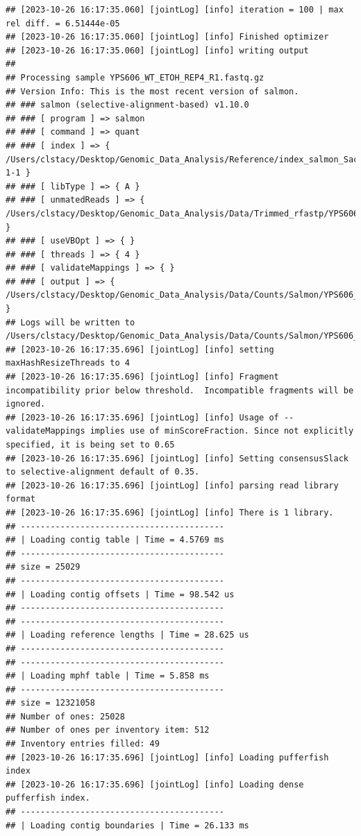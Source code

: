 \documentclass[
]{book}
\begin{document}
\begin{verbatim}
## [2023-10-26 16:17:35.060] [jointLog] [info] iteration = 100 | max rel diff. = 6.51444e-05
## [2023-10-26 16:17:35.060] [jointLog] [info] Finished optimizer
## [2023-10-26 16:17:35.060] [jointLog] [info] writing output 
## 
## Processing sample YPS606_WT_ETOH_REP4_R1.fastq.gz
## Version Info: This is the most recent version of salmon.
## ### salmon (selective-alignment-based) v1.10.0
## ### [ program ] => salmon 
## ### [ command ] => quant 
## ### [ index ] => { /Users/clstacy/Desktop/Genomic_Data_Analysis/Reference/index_salmon_Saccharomyces_cerevisiae.R64-1-1 }
## ### [ libType ] => { A }
## ### [ unmatedReads ] => { /Users/clstacy/Desktop/Genomic_Data_Analysis/Data/Trimmed_rfastp/YPS606_WT_ETOH_REP4_R1.fastq.gz }
## ### [ useVBOpt ] => { }
## ### [ threads ] => { 4 }
## ### [ validateMappings ] => { }
## ### [ output ] => { /Users/clstacy/Desktop/Genomic_Data_Analysis/Data/Counts/Salmon/YPS606_WT_ETOH_REP4_R1.fastq.gz_quant }
## Logs will be written to /Users/clstacy/Desktop/Genomic_Data_Analysis/Data/Counts/Salmon/YPS606_WT_ETOH_REP4_R1.fastq.gz_quant/logs
## [2023-10-26 16:17:35.696] [jointLog] [info] setting maxHashResizeThreads to 4
## [2023-10-26 16:17:35.696] [jointLog] [info] Fragment incompatibility prior below threshold.  Incompatible fragments will be ignored.
## [2023-10-26 16:17:35.696] [jointLog] [info] Usage of --validateMappings implies use of minScoreFraction. Since not explicitly specified, it is being set to 0.65
## [2023-10-26 16:17:35.696] [jointLog] [info] Setting consensusSlack to selective-alignment default of 0.35.
## [2023-10-26 16:17:35.696] [jointLog] [info] parsing read library format
## [2023-10-26 16:17:35.696] [jointLog] [info] There is 1 library.
## -----------------------------------------
## | Loading contig table | Time = 4.5769 ms
## -----------------------------------------
## size = 25029
## -----------------------------------------
## | Loading contig offsets | Time = 98.542 us
## -----------------------------------------
## -----------------------------------------
## | Loading reference lengths | Time = 28.625 us
## -----------------------------------------
## -----------------------------------------
## | Loading mphf table | Time = 5.858 ms
## -----------------------------------------
## size = 12321058
## Number of ones: 25028
## Number of ones per inventory item: 512
## Inventory entries filled: 49
## [2023-10-26 16:17:35.696] [jointLog] [info] Loading pufferfish index
## [2023-10-26 16:17:35.696] [jointLog] [info] Loading dense pufferfish index.
## -----------------------------------------
## | Loading contig boundaries | Time = 26.133 ms

\end{verbatim}
\end{document}
